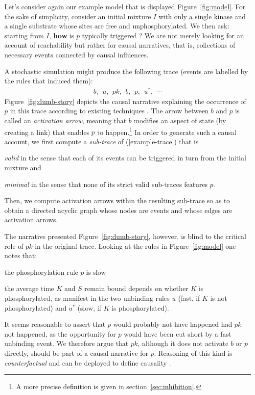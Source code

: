 
Let's consider again our example model that is displayed
Figure~\ref{fig:model}.  For the sake of simplicity, consider an
initial mixture $I$ with only a single kinase and a single substrate
whose sites are free and unphosphorylated. We then ask: starting from
$I$, \textbf{how} is $p$ typically triggered ? We are not merely
looking for an account of reachability but rather for causal
narratives, that is, collections of necessary events connected by
causal influences.

A stochastic simulation might produce the following trace (events are
labelled by the rules that induced them):
\begin{align}\label{example-trace} b,\ \ u,\ \ pk,\ \ b,\ \ p,\ \
  u^{*},\ \ \cdots
\end{align} Figure~\ref{fig:dumb-story} depicts the causal narrative
explaining the occurrence of $p$ in this trace according to existing techniques
\cite{DBLP:conf/fsttcs/DanosFFHH12,DanosEtAl-CONCUR07}. The arrow
between $b$ and $p$ is called an \textit{activation arrow}, meaning
that $b$ modifies an aspect of state (by creating a link) that enables
$p$ to happen.\footnote{A more precise definition is given in section~\ref{sec:inhibition}.} In order to generate such a causal account, we first compute
a \emph{sub-trace} of (\ref{example-trace}) that is 
\begin{inparaenum}[(i)]
\item \emph{valid} in the sense that each of its events can be
  triggered in turn from the initial mixture and
\item \emph{minimal} in the sense that none of its strict valid
  sub-traces features $p$.
\end{inparaenum}
Then, we compute activation arrows within the resulting sub-trace so
as to obtain a directed acyclic graph whose nodes are events and whose
edges are activation arrows.



The narrative presented Figure~\ref{fig:dumb-story}, however, is blind
to the critical role of $pk$ in the original trace. Looking at the
rules in Figure~\ref{fig:model} one notes that:
\begin{inparaenum}[(i)]
\item the phosphorylation rule $p$ is slow
\item the average time $K$ and $S$ remain bound depends on whether $K$
  is phosphorylated, as manifest in the two unbinding rules $u$ (fast,
  if $K$ is not phosphorylated) and $u^{*}$ (slow, if $K$ is
  phosphorylated).
\end{inparaenum} It seems reasonable to assert that $p$ would probably
not have happened had $pk$ not happened, as the opportunity for $p$
would have been cut short by a fast unbinding event. We therefore
argue that $pk$, although it does not activate $b$ or $p$ directly,
should be part of a causal narrative for $p$. Reasoning of this kind
is \textit{counterfactual} and can be deployed to define causality
\cite{lewis1974causation,pearl2009causality}.

